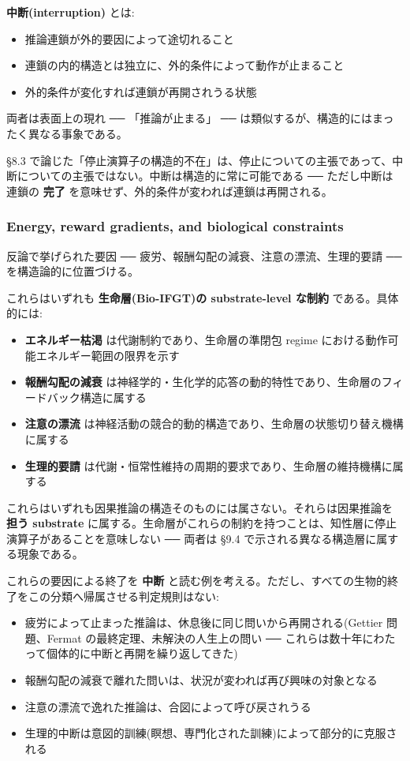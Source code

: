 \textbf{中断(interruption)} とは:
\begin{itemize}
\item 推論連鎖が外的要因によって途切れること
\item 連鎖の内的構造とは独立に、外的条件によって動作が止まること
\item 外的条件が変化すれば連鎖が再開されうる状態
\end{itemize}

両者は表面上の現れ ── 「推論が止まる」 ── は類似するが、構造的にはまったく異なる事象である。

\S{}8.3 で論じた「停止演算子の構造的不在」は、停止についての主張であって、中断についての主張ではない。中断は構造的に常に可能である ── ただし中断は連鎖の \textbf{完了} を意味せず、外的条件が変われば連鎖は再開される。

\subsubsection{Energy, reward gradients, and biological constraints}


反論で挙げられた要因 ── 疲労、報酬勾配の減衰、注意の漂流、生理的要請 ── を構造論的に位置づける。

これらはいずれも \textbf{生命層(Bio-IFGT)の substrate-level な制約} である。具体的には:

\begin{itemize}
\item \textbf{エネルギー枯渇} は代謝制約であり、生命層の準閉包 regime における動作可能エネルギー範囲の限界を示す
\item \textbf{報酬勾配の減衰} は神経学的・生化学的応答の動的特性であり、生命層のフィードバック構造に属する
\item \textbf{注意の漂流} は神経活動の競合的動的構造であり、生命層の状態切り替え機構に属する
\item \textbf{生理的要請} は代謝・恒常性維持の周期的要求であり、生命層の維持機構に属する
\end{itemize}

これらはいずれも因果推論の構造そのものには属さない。それらは因果推論を \textbf{担う substrate} に属する。生命層がこれらの制約を持つことは、知性層に停止演算子があることを意味しない ── 両者は \S{}9.4 で示される異なる構造層に属する現象である。

これらの要因による終了を \textbf{中断} と読む例を考える。ただし、すべての生物的終了をこの分類へ帰属させる判定規則はない:

\begin{itemize}
\item 疲労によって止まった推論は、休息後に同じ問いから再開される(Gettier 問題、Fermat の最終定理、未解決の人生上の問い ── これらは数十年にわたって個体的に中断と再開を繰り返してきた)
\item 報酬勾配の減衰で離れた問いは、状況が変われば再び興味の対象となる
\item 注意の漂流で逸れた推論は、合図によって呼び戻されうる
\item 生理的中断は意図的訓練(瞑想、専門化された訓練)によって部分的に克服される
\end{itemize}

